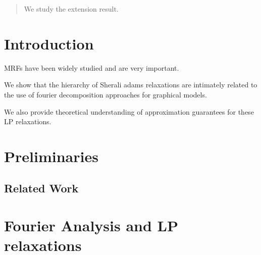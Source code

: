 \documentclass[twoside]{article}
\theoremstyle{slplain}
\theoremstyle{remark}
\theoremstyle{definition}
\begin{document}
%

%


\begin{abstract}
 We study the extension result. 

\end{abstract}

\section{Introduction}

MRFs have been widely studied and are very important. 

We show that the hierarchy of Sherali adams relaxations are intimately related to the use of fourier decomposition approaches for graphical models. 

We also provide theoretical understanding of approximation guarantees for these LP relaxations.



\section{Preliminaries}



\subsection{Related Work}



\section{Fourier Analysis and LP relaxations}
\end{document}
